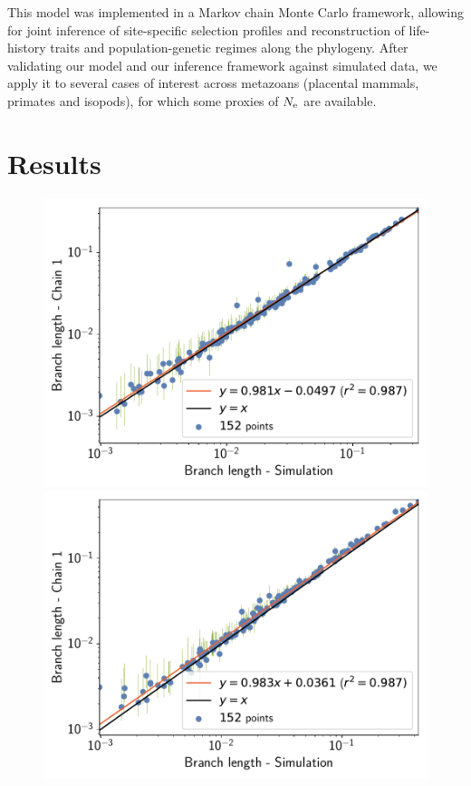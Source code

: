 \documentclass{MBE}
\begin{document}
	This model was implemented in a {Markov chain Monte Carlo} framework, allowing for joint inference of site-specific selection profiles and reconstruction of life-history traits and population-genetic regimes along the phylogeny.
	After validating our model and our inference framework against simulated data, we apply it to several cases of interest across metazoans (placental mammals, primates and isopods), for which some proxies of $N_{\text{e}}$ are available.


	\section{Results}
	\label{sec:Results}

	\begin{figure}[ht]
		\centering
		\begin{minipage}{0.32\linewidth}
			\includegraphics[width=\linewidth, page=1]{simulations/BranchWise_SimuDiv_SiteMutSelBranchNe_BranchCorrelation_Log10BranchLength}
		\end{minipage}
		\hfill
		\begin{minipage}{0.32\linewidth}
			\includegraphics[width=\linewidth, page=1]{simulations/SimuPoly_SiteMutSelBranchNe_BranchCorrelation_Log10BranchLength}

\end{minipage}
\end{figure}
\end{document}
